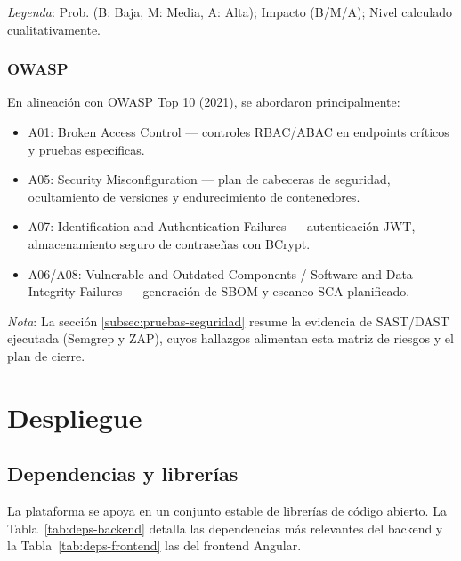 \documentclass[12pt,a4paper,oneside]{report}
\begin{document}
\noindent\footnotesize\textit{Leyenda}: Prob. (B: Baja, M: Media, A: Alta); Impacto (B/M/A); Nivel calculado cualitativamente.

\subsubsection{OWASP}

En alineación con OWASP Top 10 (2021), se abordaron principalmente:
\begin{itemize}
  \item A01: Broken Access Control — controles RBAC/ABAC en endpoints críticos y pruebas específicas.
  \item A05: Security Misconfiguration — plan de cabeceras de seguridad, ocultamiento de versiones y endurecimiento de contenedores.
  \item A07: Identification and Authentication Failures — autenticación JWT, almacenamiento seguro de contraseñas con BCrypt.
  \item A06/A08: Vulnerable and Outdated Components / Software and Data Integrity Failures — generación de SBOM y escaneo SCA planificado.
\end{itemize}

\noindent\textit{Nota}: La sección \ref{subsec:pruebas-seguridad} resume la evidencia de SAST/DAST ejecutada (Semgrep y ZAP), cuyos hallazgos alimentan esta matriz de riesgos y el plan de cierre.

\section{Despliegue}\label{sec:despliegue}

\subsection{Dependencias y librerías}\label{subsec:dependencias}

La plataforma se apoya en un conjunto estable de librerías de código abierto. La Tabla~\ref{tab:deps-backend} detalla las dependencias más relevantes del backend y la Tabla~\ref{tab:deps-frontend} las del frontend Angular.
\end{document}
